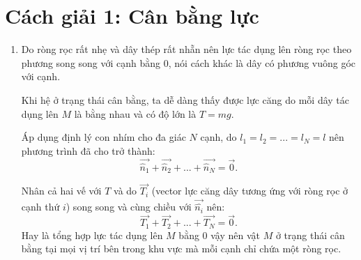 \section{Cách giải 1: Cân bằng lực}
\begin{enumerate}[label=(\alph*)]
\item Do ròng rọc rất nhẹ và dây thép rất nhẵn nên lực tác dụng lên ròng rọc theo phương song song với cạnh bằng $0$, nói cách khác là dây có phương vuông góc với cạnh.

Khi hệ ở trạng thái cân bằng, ta dễ dàng thấy được lực căng do mỗi dây tác dụng lên $M$ là bằng nhau và có độ lớn là $T=mg$.

Áp dụng định lý con nhím cho đa giác $N$ cạnh, do $l_1=l_2=...=l_N=l$ nên phương trình đã cho trở thành:
\begin{equation}
\vec{\hat{n}_1}+\vec{\hat{n}_2}+...+\vec{\hat{n}_N}=\vec{0}.
\end{equation}

Nhân cả hai vế với $T$ và do $\vec{T_i}$ (vector lực căng dây tương ứng với ròng rọc ở cạnh thứ $i$) song song và cùng chiều với $\vec{\hat{n_i}}$ nên:
\begin{equation}
\vec{T_1} + \vec{T_2}+...+\vec{T_N}=\vec{0}.
\end{equation}
Hay là tổng hợp lực tác dụng lên $M$ bằng $0$ vậy nên vật $M$ ở trạng thái cân bằng tại mọi vị trí bên trong khu vực mà mỗi cạnh chỉ chứa một ròng rọc.


\end{enumerate}
